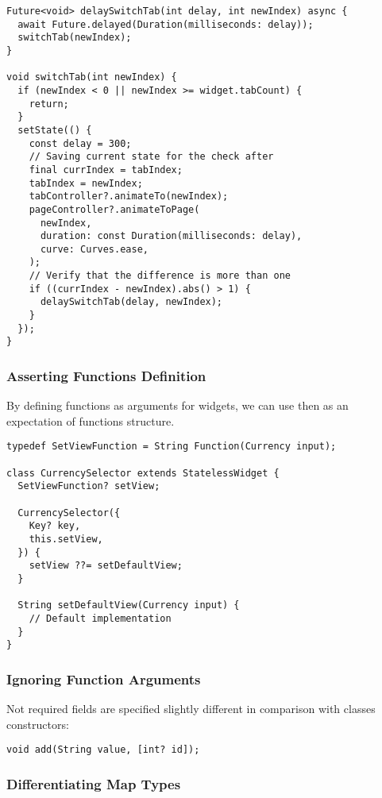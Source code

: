 \begin{lstlisting}
Future<void> delaySwitchTab(int delay, int newIndex) async {
  await Future.delayed(Duration(milliseconds: delay));
  switchTab(newIndex);
}

void switchTab(int newIndex) {
  if (newIndex < 0 || newIndex >= widget.tabCount) {
    return;
  }
  setState(() {
    const delay = 300;
    // Saving current state for the check after 
    final currIndex = tabIndex;
    tabIndex = newIndex;
    tabController?.animateTo(newIndex);
    pageController?.animateToPage(
      newIndex,
      duration: const Duration(milliseconds: delay),
      curve: Curves.ease,
    );
    // Verify that the difference is more than one
    if ((currIndex - newIndex).abs() > 1) {
      delaySwitchTab(delay, newIndex);
    }
  });
}
\end{lstlisting}


\subsubsection{Asserting Functions Definition}

By defining functions as arguments for widgets, we can use then as an expectation of functions structure.

\begin{lstlisting}
typedef SetViewFunction = String Function(Currency input);

class CurrencySelector extends StatelessWidget {
  SetViewFunction? setView;

  CurrencySelector({
    Key? key,
    this.setView,
  }) {
    setView ??= setDefaultView;
  }

  String setDefaultView(Currency input) {
    // Default implementation
  }
}
\end{lstlisting}


\subsubsection{Ignoring Function Arguments}

Not required fields are specified slightly different in comparison with classes constructors:

\begin{lstlisting}
void add(String value, [int? id]);
\end{lstlisting}


\subsubsection{Differentiating Map Types}

